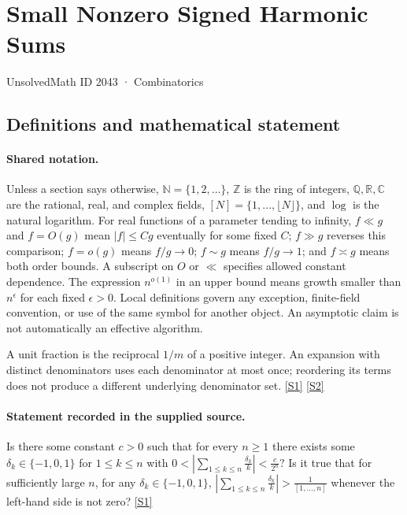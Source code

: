 \documentclass[11pt,a4paper]{article}
\newcommand{\N}{\mathbb{N}}
\newcommand{\Z}{\mathbb{Z}}
\newcommand{\Q}{\mathbb{Q}}
\newcommand{\R}{\mathbb{R}}
\newcommand{\C}{\mathbb{C}}
\newcommand{\sref}[2]{\hyperlink{source:#1:#2}{[S#2]}}
\begin{document}

\setcounter{section}{2042}

\section{Small Nonzero Signed Harmonic Sums}\label{2043}

{\small\sffamily UnsolvedMath ID 2043 · Combinatorics}

\subsection{Definitions and mathematical statement}

\paragraph{Shared notation.}Unless a section says otherwise, $\N=\{1,2,\ldots\}$,
$\Z$ is the ring of integers, $\Q,\R,\C$ are the rational, real, and complex
fields, $[N]=\{1,\ldots,\lfloor N\rfloor\}$, and $\log$ is the natural
logarithm. For real functions of a parameter tending to infinity,
$f\ll g$ and $f=O(g)$ mean $|f|\leq Cg$ eventually for some fixed $C$;
$f\gg g$ reverses this comparison; $f=o(g)$ means $f/g\to0$;
$f\sim g$ means $f/g\to1$; and $f\asymp g$ means both order bounds.
A subscript on $O$ or $\ll$ specifies allowed constant dependence.
The expression $n^{o(1)}$ in an upper bound means growth smaller than
$n^\epsilon$ for each fixed $\epsilon>0$. Local definitions govern any
exception, finite-field convention, or use of the same symbol for another
object. An asymptotic claim is not automatically an effective algorithm.



A unit fraction is the reciprocal $1/m$ of a positive integer. An expansion with distinct denominators uses each denominator at most once; reordering its terms does not produce a different underlying denominator set. \sref{2043}{1} \sref{2043}{2}

\paragraph{Statement recorded in the supplied source.}
Is there some constant $c>0$ such that for every $n\geq 1$ there exists some $\delta_k\in \{-1,0,1\}$ for $1\leq k\leq n$ with $ 0< \left\lvert \sum_{1\leq k\leq n}\frac{\delta_k}{k}\right\rvert < \frac{c}{2^n}? $ Is it true that for sufficiently large $n$, for any $\delta_k\in \{-1,0,1\}$, $ \left\lvert \sum_{1\leq k\leq n}\frac{\delta_k}{k}\right\rvert > \frac{1}{[1,\ldots,n]} $ whenever the left-hand side is not zero? \sref{2043}{1}
\end{document}
